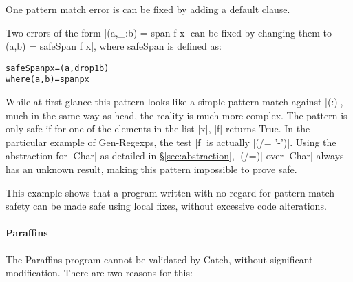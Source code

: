 \documentclass[preprint]{sigplanconf}
\newcommand{\C}[1]{\textsf{#1}}
\newenvironment{code}{\begin{alltt}\small}{\end{alltt}}
\begin{document}
One pattern match error is can be fixed by adding a default clause.

Two errors of the form |(a,_:b) = span f x| can be fixed by changing them to |(a,b) = safeSpan f x|, where \C{safeSpan} is defined as:

\begin{code}
safeSpan p x = (a, drop 1 b)
    where (a,b) = span p x
\end{code}

While at first glance this pattern looks like a simple pattern match against |(:)|, much in the same way as \C{head}, the reality is much more complex. The pattern is only safe if for one of the elements in the list |x|, |f| returns True. In the particular example of Gen-Regexps, the test |f| is actually |(/= '-')|. Using the abstraction for |Char| as detailed in \S\ref{sec:abstraction}, |(/=)| over |Char| always has an unknown result, making this pattern impossible to prove safe.

This example shows that a program written with no regard for pattern match safety can be made safe using local fixes, without excessive code alterations.

\paragraph{Paraffins}

The Paraffins program cannot be validated by Catch, without significant modification. There are two reasons for this:
\end{document}
